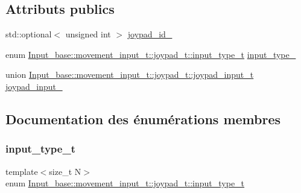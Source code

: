 \subsection*{Attributs publics}
\begin{DoxyCompactItemize}
\item 
std\+::optional$<$ unsigned int $>$ \hyperlink{struct_input__base_1_1movement__input__t_1_1joypad__t_aacd21b45339281eab5b674cc16c137d4}{joypad\+\_\+id\+\_\+}
\item 
enum \hyperlink{struct_input__base_1_1movement__input__t_1_1joypad__t_a85cbe03962d167ab3a70fb322aa9d09d}{Input\+\_\+base\+::movement\+\_\+input\+\_\+t\+::joypad\+\_\+t\+::input\+\_\+type\+\_\+t} \hyperlink{struct_input__base_1_1movement__input__t_1_1joypad__t_a2bd8305d9d6ef15dd9a9e4f82c038938}{input\+\_\+type\+\_\+}
\item 
union \hyperlink{union_input__base_1_1movement__input__t_1_1joypad__t_1_1joypad__input__t}{Input\+\_\+base\+::movement\+\_\+input\+\_\+t\+::joypad\+\_\+t\+::joypad\+\_\+input\+\_\+t} \hyperlink{struct_input__base_1_1movement__input__t_1_1joypad__t_ab5bd66567a2fc8529d89adf9d22747ae}{joypad\+\_\+input\+\_\+}
\end{DoxyCompactItemize}


\subsection{Documentation des énumérations membres}
\mbox{\label{struct_input__base_1_1movement__input__t_1_1joypad__t_a85cbe03962d167ab3a70fb322aa9d09d}} 
\subsubsection{\texorpdfstring{input\+\_\+type\+\_\+t}{input\_type\_t}}
{\footnotesize\ttfamily template$<$size\+\_\+t N$>$ \\
enum \hyperlink{struct_input__base_1_1movement__input__t_1_1joypad__t_a85cbe03962d167ab3a70fb322aa9d09d}{Input\+\_\+base\+::movement\+\_\+input\+\_\+t\+::joypad\+\_\+t\+::input\+\_\+type\+\_\+t}}

